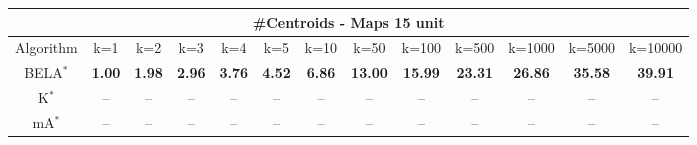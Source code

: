 \begin{tabular}{c|cccccccccccc}\toprule
\multicolumn{13}{c}{#Centroids - Maps 15 unit}\\ \midrule
Algorithm & k=1 & k=2 & k=3 & k=4 & k=5 & k=10 & k=50 & k=100 & k=500 & k=1000 & k=5000 & k=10000 \\ \midrule
BELA$^*$ & \textbf{1.00} & \textbf{1.98} & \textbf{2.96} & \textbf{3.76} & \textbf{4.52} & \textbf{6.86} & \textbf{13.00} & \textbf{15.99} & \textbf{23.31} & \textbf{26.86} & \textbf{35.58} & \textbf{39.91} \\
K$^*$ & -- & -- & -- & -- & -- & -- & -- & -- & -- & -- & -- & -- \\
mA$^*$ & -- & -- & -- & -- & -- & -- & -- & -- & -- & -- & -- & -- \\ \bottomrule 
\end{tabular}
